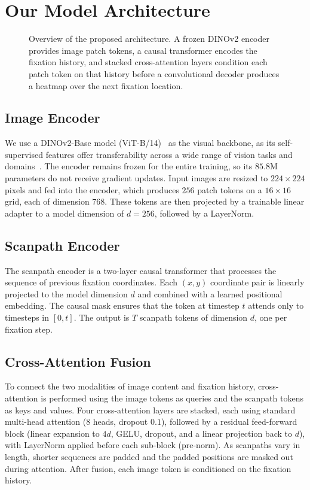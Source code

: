 \section{Our Model Architecture}
\label{sec:architecture}

\begin{figure}[t]
    \centering
    \caption{Overview of the proposed architecture. A frozen DINOv2 encoder
    provides image patch tokens, a causal transformer encodes the fixation
    history, and stacked cross-attention layers condition each patch token on
    that history before a convolutional decoder produces a heatmap over the
    next fixation location.}
    \label{fig:architecture}
\end{figure}

\subsection{Image Encoder}
\label{sec:image-encoder}
We use a DINOv2-Base model (ViT-B/14)~\cite{oquab2024dinov2, dosovitskiy2021vit}
as the visual backbone, as its self-supervised features offer transferability
across a wide range of vision tasks and domains~\cite{oquab2024dinov2}. The
encoder remains frozen for the entire training, so its $85.8$M parameters do
not receive gradient updates. Input images are resized to $224\times224$
pixels and fed into the encoder, which produces $256$ patch tokens on a
$16\times16$ grid, each of dimension $768$. These tokens are then projected by
a trainable linear adapter to a model dimension of $d = 256$, followed by a
LayerNorm.

\subsection{Scanpath Encoder}
\label{sec:scanpath-encoder}
The scanpath encoder is a two-layer causal transformer that processes the
sequence of previous fixation coordinates. Each $(x, y)$ coordinate pair is
linearly projected to the model dimension $d$ and combined with a learned
positional embedding. The causal mask ensures that the token at timestep $t$
attends only to timesteps in $[0, t]$. The output is $T$ scanpath tokens of
dimension $d$, one per fixation step.

\subsection{Cross-Attention Fusion}
\label{sec:fusion}
To connect the two modalities of image content and fixation history,
cross-attention is performed using the image tokens as queries and the
scanpath tokens as keys and values. Four cross-attention layers are stacked,
each using standard multi-head attention ($8$ heads, dropout $0.1$), followed
by a residual feed-forward block (linear expansion to $4d$, GELU, dropout, and
a linear projection back to $d$), with LayerNorm applied before each sub-block
(pre-norm). As scanpaths vary in length, shorter sequences are padded and the
padded positions are masked out during attention. After fusion, each image
token is conditioned on the fixation history.

